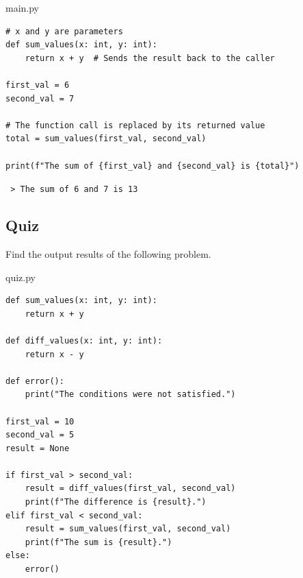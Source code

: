 \documentclass{report}
\begin{document}
\begin{vscode}{main.py}
\begin{lstlisting}[style=vscodeStyle]
# x and y are parameters
def sum_values(x: int, y: int):
    return x + y  # Sends the result back to the caller

first_val = 6
second_val = 7

# The function call is replaced by its returned value
total = sum_values(first_val, second_val)

print(f"The sum of {first_val} and {second_val} is {total}")
\end{lstlisting}
\end{vscode}

\begin{terminal}
\texttt{\color{terminalFont} > The sum of 6 and 7 is 13 }\\
\end{terminal}

\subsection*{Quiz}
Find the output results  of the following problem.
\begin{vscode}{quiz.py}
\begin{lstlisting}[style=vscodeStyle]
def sum_values(x: int, y: int):
    return x + y

def diff_values(x: int, y: int):
    return x - y

def error():
    print("The conditions were not satisfied.")
    
first_val = 10
second_val = 5
result = None

if first_val > second_val:
    result = diff_values(first_val, second_val)
    print(f"The difference is {result}.")
elif first_val < second_val:
    result = sum_values(first_val, second_val)
    print(f"The sum is {result}.")
else:
    error()
\end{lstlisting}
\end{vscode}
\end{document}
